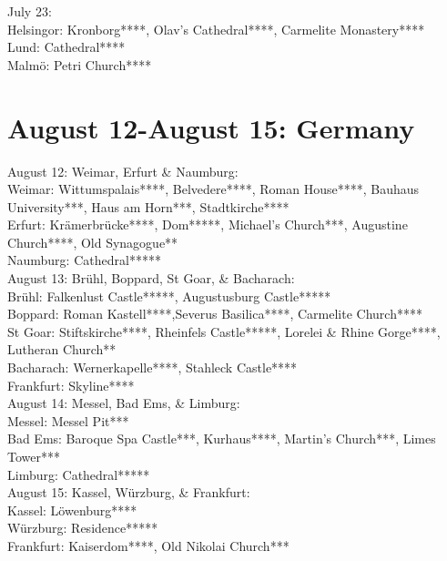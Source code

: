 July 23:\\

Helsingor: Kronborg****, Olav's Cathedral****, Carmelite Monastery****\\
Lund: Cathedral****\\
Malm\"o: Petri Church****


\section{August 12-August 15: Germany}
\label{2023:Germany}

August 12: Weimar, Erfurt \& Naumburg:\\

Weimar: Wittumspalais****, Belvedere****, Roman House****, Bauhaus University***, Haus am Horn***, Stadtkirche****\\
Erfurt: Kr\"amerbr\"ucke****, Dom*****, Michael's Church***, Augustine Church****, Old Synagogue**\\
Naumburg: Cathedral*****\\

August 13: Br\"uhl, Boppard, St Goar, \& Bacharach:\\

Br\"uhl: Falkenlust Castle*****, Augustusburg Castle*****\\
Boppard: Roman Kastell****,Severus Basilica****, Carmelite Church****\\
St Goar: Stiftskirche****, Rheinfels Castle*****, Lorelei \& Rhine Gorge****, Lutheran Church**\\
Bacharach: Wernerkapelle****, Stahleck Castle****\\
Frankfurt: Skyline****\\

August 14: Messel, Bad Ems, \& Limburg:\\

Messel: Messel Pit***\\
Bad Ems: Baroque Spa Castle***, Kurhaus****, Martin's Church***, Limes Tower***\\
Limburg: Cathedral*****\\

August 15: Kassel, W\"urzburg, \& Frankfurt:\\

Kassel: L\"owenburg****\\
W\"urzburg: Residence*****\\
Frankfurt: Kaiserdom****, Old Nikolai Church***\\

